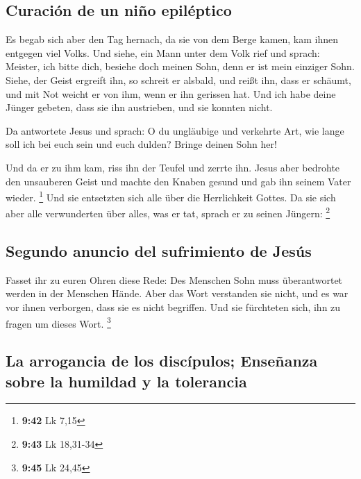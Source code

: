 \hypertarget{curaciuxf3n-de-un-niuxf1o-epiluxe9ptico}{%
\subsection{Curación de un niño
epiléptico}\label{curaciuxf3n-de-un-niuxf1o-epiluxe9ptico}}

 Es begab sich aber den Tag hernach, da sie von dem Berge
kamen, kam ihnen entgegen viel Volks.  Und siehe, ein
Mann unter dem Volk rief und sprach: Meister, ich bitte dich, besiehe
doch meinen Sohn, denn er ist mein einziger Sohn.  Siehe,
der Geist ergreift ihn, so schreit er alsbald, und reißt ihn, dass er
schäumt, und mit Not weicht er von ihm, wenn er ihn gerissen hat.
 Und ich habe deine Jünger gebeten, dass sie ihn
austrieben, und sie konnten nicht.

 Da antwortete Jesus und sprach: O du ungläubige und
verkehrte Art, wie lange soll ich bei euch sein und euch dulden? Bringe
deinen Sohn her!

 Und da er zu ihm kam, riss ihn der Teufel und zerrte
ihn. Jesus aber bedrohte den unsauberen Geist und machte den Knaben
gesund und gab ihn seinem Vater wieder. \footnote{\textbf{9:42} Lk 7,15}
 Und sie entsetzten sich alle über die Herrlichkeit
Gottes. Da sie sich aber alle verwunderten über alles, was er tat,
sprach er zu seinen Jüngern: \footnote{\textbf{9:43} Lk 18,31-34}

\hypertarget{segundo-anuncio-del-sufrimiento-de-jesuxfas}{%
\subsection{Segundo anuncio del sufrimiento de
Jesús}\label{segundo-anuncio-del-sufrimiento-de-jesuxfas}}

 Fasset ihr zu euren Ohren diese Rede: Des Menschen Sohn
muss überantwortet werden in der Menschen Hände.  Aber
das Wort verstanden sie nicht, und es war vor ihnen verborgen, dass sie
es nicht begriffen. Und sie fürchteten sich, ihn zu fragen um dieses
Wort. \footnote{\textbf{9:45} Lk 24,45}

\hypertarget{la-arrogancia-de-los-discuxedpulos-enseuxf1anza-sobre-la-humildad-y-la-tolerancia}{%
\subsection{La arrogancia de los discípulos; Enseñanza sobre la humildad
y la
tolerancia}\label{la-arrogancia-de-los-discuxedpulos-enseuxf1anza-sobre-la-humildad-y-la-tolerancia}}

